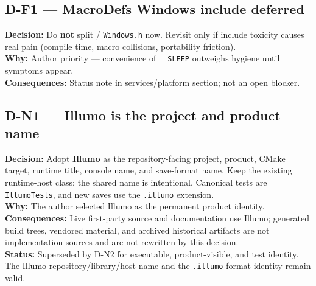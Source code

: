 \subsection*{D-F1 --- MacroDefs Windows include deferred}
\begin{decisionbox}[title={D-F1 \quad 2026-07-30}]
\textbf{Decision:} Do \textbf{not} split  /
\texttt{Windows.h} now. Revisit only if include toxicity causes real pain
(compile time, macro collisions, portability friction).\\
\textbf{Why:} Author priority --- convenience of \texttt{\_\_SLEEP} outweighs
hygiene until symptoms appear.\\
\textbf{Consequences:} Status note in services/platform section; not an open
blocker.
\end{decisionbox}

\subsection*{D-N1 --- Illumo is the project and product name}
\begin{decisionbox}[title={D-N1 \quad 2026-08-04}]
\textbf{Decision:} Adopt \textbf{Illumo} as the repository-facing project,
product, CMake target, runtime title, console name, and save-format name. Keep
the existing  runtime-host class; the shared name is
intentional. Canonical tests are \texttt{IllumoTests}, and new saves use the
\texttt{.illumo} extension.\\
\textbf{Why:} The author selected Illumo as the permanent product identity.\\
\textbf{Consequences:} Live first-party source and documentation use Illumo;
generated build trees, vendored material, and archived historical artifacts are
not implementation sources and are not rewritten by this decision.\\
\textbf{Status:} Superseded by D-N2 for executable, product-visible, and test
identity. The Illumo repository/library/host name and the \texttt{.illumo}
format identity remain valid.
\end{decisionbox}

